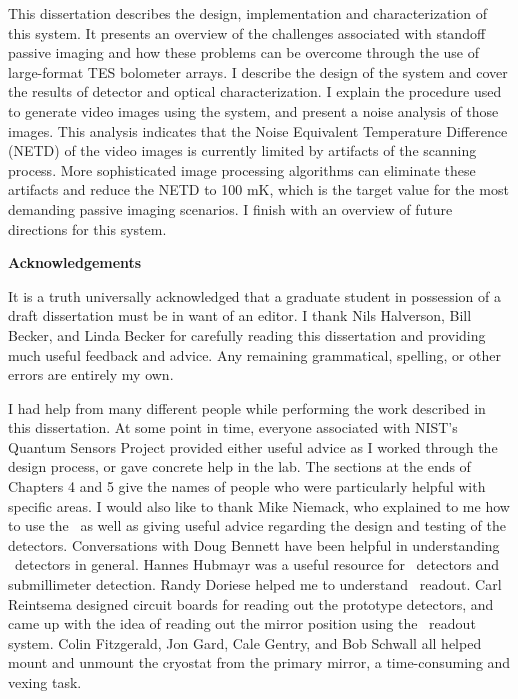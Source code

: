 \documentclass[12pt,letterpaper,openany]{memoir}
\numberwithin{equation}{chapter}
\numberwithin{figure}{chapter}
\numberwithin{table}{chapter}
\begin{document}
This dissertation describes the design, implementation and characterization of this system.
It presents an overview of the challenges associated with standoff passive imaging and how these problems can be overcome through the use of large-format TES bolometer arrays.
I describe the design of the system and cover the results of detector and optical characterization.
I explain the procedure used to generate video images using the system, and present a noise analysis of those images.
This analysis indicates that the Noise Equivalent Temperature Difference (NETD) of the video images is currently limited by artifacts of the scanning process.
More sophisticated image processing algorithms can eliminate these artifacts and reduce the NETD to 100 mK, which is the target value for the most demanding passive imaging scenarios.
I finish with an overview of future directions for this system.

\newpage
\begin{flushleft}\textbf{\Huge Acknowledgements}\end{flushleft}
\vspace{0.25in}

It is a truth universally acknowledged that a graduate student in possession of a draft dissertation must be in want of an editor.
I thank Nils Halverson, Bill Becker, and Linda Becker for carefully reading this dissertation and providing much useful feedback and advice.
Any remaining grammatical, spelling, or other errors are entirely my own.

I had help from many different people while performing the work described in this dissertation.
At some point in time, everyone associated with NIST's Quantum Sensors Project provided either useful advice as I worked through the design process, or gave concrete help in the lab.
The sections at the ends of Chapters 4 and 5 give the names of people who were particularly helpful with specific areas.
I would also like to thank Mike Niemack, who explained to me how to use the \MCE\ as well as giving useful advice regarding the design and testing of the detectors.
Conversations with Doug Bennett have been helpful in understanding \TES\ detectors in general.
Hannes Hubmayr was a useful resource for \TES\ detectors and submillimeter detection.
Randy Doriese helped me to understand \SQUID\ readout.
Carl Reintsema designed circuit boards for reading out the prototype detectors, and came up with the idea of reading out the mirror position using the \SQUID\ readout system.
Colin Fitzgerald, Jon Gard, Cale Gentry, and Bob Schwall all helped mount and unmount the cryostat from the primary mirror, a time-consuming and vexing task.
\end{document}
